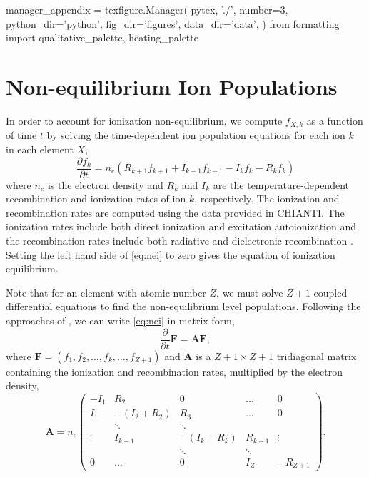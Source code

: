 \begin{pycode}
manager_appendix = texfigure.Manager(
    pytex, './',
    number=3,
    python_dir='python',
    fig_dir='figures',
    data_dir='data',
)
from formatting import qualitative_palette, heating_palette
\end{pycode}
\section{Non-equilibrium Ion Populations}\label{nei}

In order to account for ionization non-equilibrium, we compute $f_{X,k}$ as a function of time $t$ by solving the time-dependent ion population equations for each ion $k$ in each element $X$,
\begin{equation}\label{eq:nei}
    \frac{\partial f_k}{\partial t} = n_e(R_{k+1}f_{k+1} + I_{k-1}f_{k-1} - I_kf_k - R_kf_k)
\end{equation}
where $n_e$ is the electron density and $R_k$ and $I_k$ are the temperature-dependent recombination and ionization rates of ion $k$, respectively. The ionization and recombination rates are computed using the data provided in CHIANTI. The ionization rates include both direct ionization and excitation autoionization and the recombination rates include both radiative and dielectronic recombination \citep[see section 6 of][]{young_chianti_2016}. Setting the left hand side of \autoref{eq:nei} to zero gives the equation of ionization equilibrium.

Note that for an element with atomic number $Z$, we must solve $Z+1$ coupled differential equations to find the non-equilibrium level populations. Following the approaches of \citet{masai_x-ray_1984,hughes_self-consistent_1985,shen_lagrangian_2015}, we can write \autoref{eq:nei} in matrix form,
\begin{equation}\label{eq:nei_mat}
    \frac{\partial}{\partial t}\mathbf{F} = \mathbf{A}\mathbf{F},
\end{equation}
where $\mathbf{F}=(f_1,f_2,\ldots,f_k,\ldots,f_{Z+1})$ and $\mathbf{A}$ is a ${Z+1\times Z+1}$ tridiagonal matrix containing the ionization and recombination rates, multiplied by the electron density,
\begin{equation}\label{eq:rate_mat}
    \mathbf{A} = n_e
        \begin{pmatrix}
            -I_1 & R_2 & 0 & \dots & 0 \\
            I_1 & -(I_2 + R_2) & R_3 & \dots & 0 \\
             & \ddots & \ddots & &  \\
            \vdots & I_{k-1} & -(I_k + R_k) & R_{k+1} & \vdots \\
             & & \ddots & \ddots & \\
            0 & \dots & 0 & I_{Z} & -R_{Z+1} 
        \end{pmatrix}.
\end{equation}

